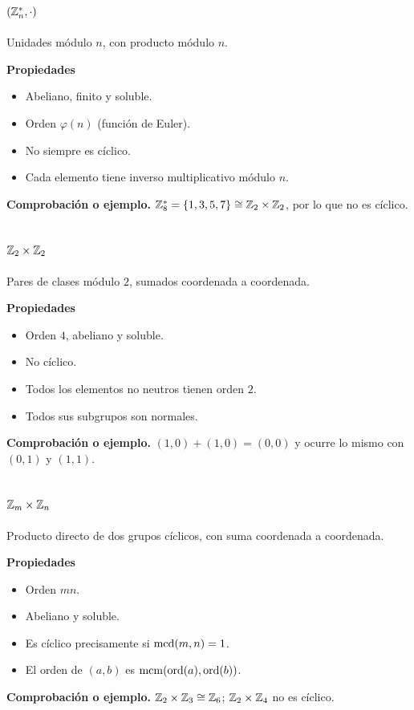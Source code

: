 \documentclass[11pt,a4paper]{article}
\newcommand{\ord}{\operatorname{ord}}\newcommand{\gen}[1]{\langle #1\rangle}
\begin{document}
\subsection{$(\mathbb{Z}_n^*,\cdot)$}
\begin{ejemplo}
Unidades módulo $n$, con producto módulo $n$.
\end{ejemplo}
\textbf{Propiedades}
\begin{itemize}
\item Abeliano, finito y soluble.
\item Orden $\varphi(n)$ (función de Euler).
\item No siempre es cíclico.
\item Cada elemento tiene inverso multiplicativo módulo $n$.
\end{itemize}
\textbf{Comprobación o ejemplo.} $\mathbb{Z}_8^*=\{1,3,5,7\}\cong\mathbb{Z}_2\times\mathbb{Z}_2$, por lo que no es cíclico.

\subsection{$\mathbb{Z}_2\times\mathbb{Z}_2$}
\begin{ejemplo}
Pares de clases módulo $2$, sumados coordenada a coordenada.
\end{ejemplo}
\textbf{Propiedades}
\begin{itemize}
\item Orden $4$, abeliano y soluble.
\item No cíclico.
\item Todos los elementos no neutros tienen orden $2$.
\item Todos sus subgrupos son normales.
\end{itemize}
\textbf{Comprobación o ejemplo.} $(1,0)+(1,0)=(0,0)$ y ocurre lo mismo con $(0,1)$ y $(1,1)$.

\subsection{$\mathbb{Z}_m\times\mathbb{Z}_n$}
\begin{ejemplo}
Producto directo de dos grupos cíclicos, con suma coordenada a coordenada.
\end{ejemplo}
\textbf{Propiedades}
\begin{itemize}
\item Orden $mn$.
\item Abeliano y soluble.
\item Es cíclico precisamente si $\operatorname{mcd}(m,n)=1$.
\item El orden de $(a,b)$ es $\mcm(\ord(a),\ord(b))$.
\end{itemize}
\textbf{Comprobación o ejemplo.} $\mathbb{Z}_2\times\mathbb{Z}_3\cong\mathbb{Z}_6$; $\mathbb{Z}_2\times\mathbb{Z}_4$ no es cíclico.
\end{document}
